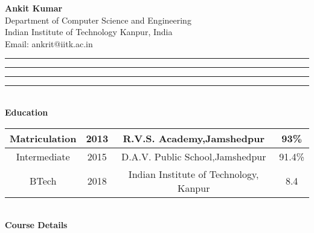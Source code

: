 \documentclass[a4paper, 11pt]{article}
\begin{document}
\noindent
\textbf{Ankit Kumar}
\\Department of Computer Science and Engineering
\\Indian Institute of Technology Kanpur, India
\\Email: ankrit@iitk.ac.in
\vspace{0.5cm}
\hrule
\vspace{0.1cm}
\hrule
\vspace{0.3cm}
\noindent
\lipsum[15]
\vspace{0.1cm}
\hrule
\vspace{0.1cm}
\hrule
\vspace{0.3cm}
\noindent
\\{\bf Education}\\

\noindent
\vspace{1cm}
\begin{tabular}{|c|c|c|c|}
  \hline
  Matriculation & 2013 & R.V.S. Academy,Jamshedpur & 93\%\\
  \hline
  Intermediate & 2015 & D.A.V. Public School,Jamshedpur & 91.4\%\\
  \hline
  BTech & 2018 & Indian Institute of Technology, Kanpur & 8.4\\
  \hline
\end{tabular}
\\{\bf Course Details}\\
\end{document}
